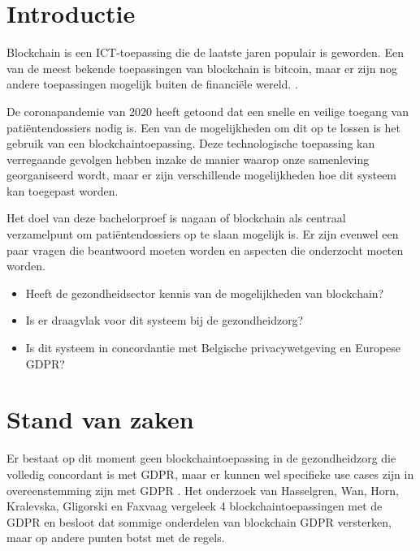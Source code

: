 
\section{Introductie} %
\label{sec:introductie}

Blockchain is een ICT-toepassing die de laatste jaren populair is geworden. Een van de meest bekende toepassingen van blockchain is bitcoin, maar er zijn nog andere toepassingen mogelijk buiten de financiële wereld. \autocite{Pilkington2016}.

De coronapandemie van 2020 heeft getoond dat een snelle en veilige toegang van patiëntendossiers nodig is. Een van de mogelijkheden om dit op te lossen is het gebruik van een blockchaintoepassing. Deze technologische toepassing kan verregaande gevolgen hebben inzake de manier waarop onze samenleving georganiseerd wordt, maar er zijn verschillende mogelijkheden hoe dit systeem kan toegepast worden. 

Het doel van deze bachelorproef is nagaan of blockchain als centraal verzamelpunt om patiëntendossiers op te slaan mogelijk is. Er zijn evenwel een paar vragen die beantwoord moeten worden en aspecten die onderzocht moeten worden.

\begin{itemize}
    \item Heeft de gezondheidsector kennis van de mogelijkheden van blockchain?
    \item Is er draagvlak voor dit systeem bij de gezondheidzorg?
    \item Is dit systeem in concordantie met Belgische privacywetgeving en Europese GDPR?
\end{itemize}



\section{Stand van zaken}
\label{sec:stand van zaken}

Er bestaat op dit moment geen blockchaintoepassing in de gezondheidzorg die volledig concordant is met GDPR, maar er kunnen wel specifieke use cases zijn in overeenstemming zijn met GDPR \autocite{Hasselgren2020}. Het onderzoek van Hasselgren, Wan, Horn, Kralevska, Gligorski en Faxvaag \autocite{Hasselgren2020} vergeleek 4 blockchaintoepassingen met de GDPR en besloot dat sommige onderdelen van blockchain GDPR versterken, maar op andere punten botst met de regels.

